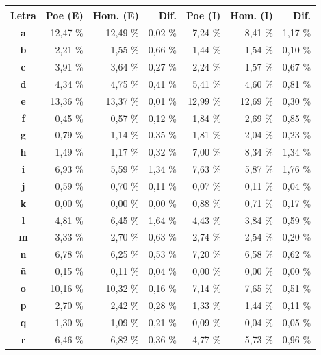 \documentclass[12pt,a4paper,twoside]{book}
\begin{document}
\begin{center}
\begin{longtable}{|c|r|r|r|r|r|r|}
\hline
\textbf{Letra} & \textbf{Poe (E)} & \textbf{Hom. (E)} & \textbf{Dif.} & \textbf{Poe (I)} & \textbf{Hom. (I)} & \textbf{Dif.} \\ \hline
\textbf{a} & 12,47 \% & 12,49 \% & 0,02  \% & 7,24 \% & 8,41  \% & 1,17  \% \\ \hline
\textbf{b} & 2,21 \% & 1,55 \% & 0,66  \% & 1,44 \% & 1,54  \% & 0,10  \% \\ \hline
\textbf{c} & 3,91 \% & 3,64 \% & 0,27  \% & 2,24 \% & 1,57  \% & 0,67  \% \\ \hline
\textbf{d} & 4,34 \% & 4,75 \% & 0,41  \% & 5,41 \% & 4,60  \% & 0,81  \% \\ \hline
\textbf{e} & 13,36 \% & 13,37 \% & 0,01  \% & 12,99 \% & 12,69  \% & 0,30  \% \\ \hline
\textbf{f} & 0,45 \% & 0,57 \% & 0,12  \% & 1,84 \% & 2,69  \% & 0,85  \% \\ \hline
\textbf{g} & 0,79 \% & 1,14 \% & 0,35  \% & 1,81 \% & 2,04  \% & 0,23  \% \\ \hline
\textbf{h} & 1,49 \% & 1,17 \% & 0,32  \% & 7,00 \% & 8,34  \% & 1,34  \% \\ \hline
\textbf{i} & 6,93 \% & 5,59 \% & 1,34  \% & 7,63 \% & 5,87  \% & 1,76  \% \\ \hline
\textbf{j} & 0,59 \% & 0,70 \% & 0,11  \% & 0,07 \% & 0,11  \% & 0,04  \% \\ \hline
\textbf{k} & 0,00 \% & 0,00 \% & 0,00  \% & 0,88 \% & 0,71  \% & 0,17  \% \\ \hline
\textbf{l} & 4,81 \% & 6,45 \% & 1,64  \% & 4,43 \% & 3,84  \% & 0,59  \% \\ \hline
\textbf{m} & 3,33 \% & 2,70 \% & 0,63  \% & 2,74 \% & 2,54  \% & 0,20  \% \\ \hline
\textbf{n} & 6,78 \% & 6,25 \% & 0,53  \% & 7,20 \% & 6,58  \% & 0,62  \% \\ \hline
\textbf{ñ} & 0,15 \% & 0,11 \% & 0,04  \% & 0,00 \% & 0,00  \% & 0,00  \% \\ \hline
\textbf{o} & 10,16 \% & 10,32 \% & 0,16  \% & 7,14 \% & 7,65  \% & 0,51  \% \\ \hline
\textbf{p} & 2,70 \% & 2,42 \% & 0,28  \% & 1,33 \% & 1,44  \% & 0,11  \% \\ \hline
\textbf{q} & 1,30 \% & 1,09 \% & 0,21  \% & 0,09 \% & 0,04  \% & 0,05  \% \\ \hline
\textbf{r} & 6,46 \% & 6,82 \% & 0,36  \% & 4,77 \% & 5,73  \% & 0,96  \% \\ \hline

\end{longtable}
\end{center}
\end{document}
